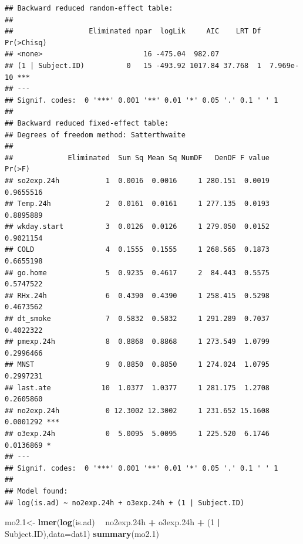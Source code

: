 \documentclass[12pt,]{article}
\newenvironment{Shaded}{\begin{snugshade}}{\end{snugshade}}
\newcommand{\DataTypeTok}[1]{\textcolor[rgb]{0.13,0.29,0.53}{#1}}
\newcommand{\DecValTok}[1]{\textcolor[rgb]{0.00,0.00,0.81}{#1}}
\newcommand{\FloatTok}[1]{\textcolor[rgb]{0.00,0.00,0.81}{#1}}
\newcommand{\KeywordTok}[1]{\textcolor[rgb]{0.13,0.29,0.53}{\textbf{#1}}}
\newcommand{\NormalTok}[1]{#1}
\newcommand{\OperatorTok}[1]{\textcolor[rgb]{0.81,0.36,0.00}{\textbf{#1}}}
\newcommand{\StringTok}[1]{\textcolor[rgb]{0.31,0.60,0.02}{#1}}
\begin{document}
\begin{verbatim}
## Backward reduced random-effect table:
## 
##                  Eliminated npar  logLik     AIC    LRT Df Pr(>Chisq)    
## <none>                        16 -475.04  982.07                         
## (1 | Subject.ID)          0   15 -493.92 1017.84 37.768  1  7.969e-10 ***
## ---
## Signif. codes:  0 '***' 0.001 '**' 0.01 '*' 0.05 '.' 0.1 ' ' 1
## 
## Backward reduced fixed-effect table:
## Degrees of freedom method: Satterthwaite 
## 
##             Eliminated  Sum Sq Mean Sq NumDF   DenDF F value    Pr(>F)    
## so2exp.24h           1  0.0016  0.0016     1 280.151  0.0019 0.9655516    
## Temp.24h             2  0.0161  0.0161     1 277.135  0.0193 0.8895889    
## wkday.start          3  0.0126  0.0126     1 279.050  0.0152 0.9021154    
## COLD                 4  0.1555  0.1555     1 268.565  0.1873 0.6655198    
## go.home              5  0.9235  0.4617     2  84.443  0.5575 0.5747522    
## RHx.24h              6  0.4390  0.4390     1 258.415  0.5298 0.4673562    
## dt_smoke             7  0.5832  0.5832     1 291.289  0.7037 0.4022322    
## pmexp.24h            8  0.8868  0.8868     1 273.549  1.0799 0.2996466    
## MNST                 9  0.8850  0.8850     1 274.024  1.0795 0.2997231    
## last.ate            10  1.0377  1.0377     1 281.175  1.2708 0.2605860    
## no2exp.24h           0 12.3002 12.3002     1 231.652 15.1608 0.0001292 ***
## o3exp.24h            0  5.0095  5.0095     1 225.520  6.1746 0.0136869 *  
## ---
## Signif. codes:  0 '***' 0.001 '**' 0.01 '*' 0.05 '.' 0.1 ' ' 1
## 
## Model found:
## log(is.ad) ~ no2exp.24h + o3exp.24h + (1 | Subject.ID)
\end{verbatim}

\begin{Shaded}
\begin{Highlighting}[]
\NormalTok{mo2}\FloatTok{.1}\NormalTok{<-}\StringTok{ }\KeywordTok{lmer}\NormalTok{(}\KeywordTok{log}\NormalTok{(is.ad) }\OperatorTok{~}\StringTok{ }\NormalTok{no2exp}\FloatTok{.24}\NormalTok{h }\OperatorTok{+}\StringTok{ }\NormalTok{o3exp}\FloatTok{.24}\NormalTok{h }\OperatorTok{+}\StringTok{ }\NormalTok{(}\DecValTok{1} \OperatorTok{|}\StringTok{ }\NormalTok{Subject.ID),}\DataTypeTok{data=}\NormalTok{dat1)}
\KeywordTok{summary}\NormalTok{(mo2}\FloatTok{.1}\NormalTok{)}
\end{Highlighting}
\end{Shaded}
\end{document}
